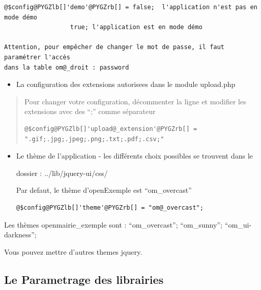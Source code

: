 \documentclass[letterpaper,10pt,french]{manual}
\begin{document}
\begin{Verbatim}[commandchars=@\[\]]
@$config@PYGZlb[]'demo'@PYGZrb[] = false;  l'application n'est pas en mode démo
                  true; l'application est en mode démo

Attention, pour empêcher de changer le mot de passe, il faut paramétrer l'accès
dans la table om@_droit : password
\end{Verbatim}
\begin{itemize}
\item {} 
La configuration des extensions autorisees dans le module upload.php

\end{itemize}
\begin{quote}

Pour changer votre configuration, décommenter la ligne et modifier les extensions avec des ``;'' comme séparateur

\begin{Verbatim}[commandchars=@\[\]]
@$config@PYGZlb[]'upload@_extension'@PYGZrb[] = ".gif;.jpg;.jpeg;.png;.txt;.pdf;.csv;"
\end{Verbatim}
\end{quote}
\begin{itemize}
\item {} 
Le thème de l'application - les différents choix possibles se trouvent dans le

dossier : ../lib/jquery-ui/css/

Par defaut, le thème d'openExemple est ``om\_overcast''

\begin{Verbatim}[commandchars=@\[\]]
@$config@PYGZlb[]'theme'@PYGZrb[] = "om@_overcast";
\end{Verbatim}

\end{itemize}

Les thèmes openmairie\_exemple sont : ``om\_overcast''; ``om\_sunny''; ``om\_ui-darkness'';

Vous pouvez mettre d'autres themes jquery.


\subsection{Le Parametrage des librairies}
\end{document}
